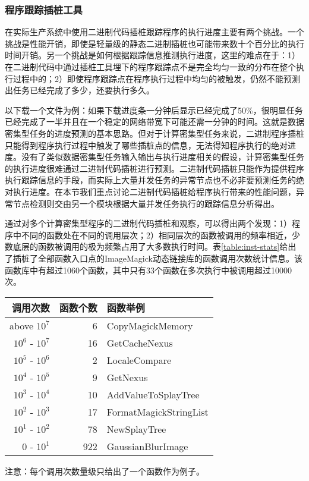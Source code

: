 \subsubsection{程序跟踪插桩工具}
\label{subsec:no2_inst}
在实际生产系统中使用二进制代码插桩跟踪程序的执行进度主要有两个挑战。一个挑战是性能开销，即使是轻量级的静态二进制插桩也可能带来数十个百分比的执行时间开销。另一个挑战是如何根据跟踪信息推测执行进度，这里的难点在于：1）在二进制代码中通过插桩工具埋下的程序跟踪点不是完全均匀一致的分布在整个执行过程中的；2）即使程序跟踪点在程序执行过程中均匀的被触发，仍然不能预测出任务已经完成了多少，还要执行多久。

以下载一个文件为例：如果下载进度条一分钟后显示已经完成了50\%，很明显任务已经完成了一半并且在一个稳定的网络带宽下可能还需一分钟的时间。这就是数据密集型任务的进度预测的基本思路。但对于计算密集型任务来说，二进制程序插桩只能得到程序执行过程中触发了哪些插桩点的信息，无法得知程序执行的绝对进度。没有了类似数据密集型任务输入输出与执行进度相关的假设，计算密集型任务的执行进度很难通过二进制代码插桩进行预测。二进制代码插桩只能作为提供程序执行跟踪信息的手段，而实际上大量并发任务的异常节点也不必非要预测任务的绝对执行进度。在本节我们重点讨论二进制代码插桩给程序执行带来的性能问题，异常节点检测则交由另一个模块根据大量并发任务执行的跟踪信息分析得出。

通过对多个计算密集型程序的二进制代码插桩和观察，可以得出两个发现：1）程序中不同的函数处在不同的调用层次；2）相同层次的函数被调用的频率相近，少数底层的函数被调用的极为频繁占用了大多数执行时间。表\ref{table:inst-stats}给出了插桩了全部函数入口点的ImageMagick动态链接库的函数调用次数统计信息。该函数库中有超过1060个函数，其中只有33个函数在多次执行中被调用超过10000次。
\begin{table*}[]
\caption{ImageMagick函数调用信息统计}
\label{table:inst-stats}
\begin{center}
\begin{tabular}{r|r|l}
\hline
调用次数 & 函数个数 & 函数举例 \\
\hline
above $10^7$ & 6 & CopyMagickMemory \\
$10^6$ - $10^7$ & 16 & GetCacheNexus \\
$10^5$ - $10^6$ & 2 & LocaleCompare \\
$10^4$ - $10^5$ & 9 & GetNexus \\
$10^3$ - $10^4$ & 10 & AddValueToSplayTree \\
$10^2$ - $10^3$ & 17 & FormatMagickStringList \\
$10^1$ - $10^2$ & 78 & NewSplayTree \\
$0$    - $10^1$ & 922 & GaussianBlurImage \\
\hline
\end{tabular}
\end{center}
注意：每个调用次数量级只给出了一个函数作为例子。
\end{table*}

